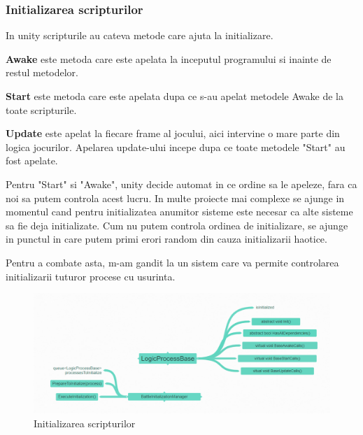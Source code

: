 \documentclass[12pt, a4paper]{article}
\begin{document}
	\subsubsection{Initializarea scripturilor}
	
	In unity scripturile au cateva metode care ajuta la initializare.
	
	\textbf{Awake} este metoda care este apelata la inceputul programului si inainte de restul metodelor.
	
	\textbf{Start} este metoda care este apelata dupa ce s-au apelat metodele Awake de la toate scripturile.
	
	\textbf{Update} este apelat la fiecare frame al jocului, aici intervine o mare parte din logica jocurilor. Apelarea update-ului incepe dupa ce toate metodele "Start" au fost apelate.
	
	Pentru "Start" si "Awake", unity decide automat in ce ordine sa le apeleze, fara ca noi sa putem controla acest lucru. In multe proiecte mai complexe se ajunge in momentul cand pentru initializatea anumitor sisteme este necesar ca alte sisteme sa fie deja initializate. Cum nu putem controla ordinea de initializare, se ajunge in punctul in care putem primi erori random din cauza initializarii haotice.
	
	Pentru a combate asta, m-am gandit la un sistem care va permite controlarea initializarii tuturor procese cu usurinta.
	
	\begin{figure}[H]
		\centering
		\includegraphics[width=1\textwidth]{logicProcessCoggle.png}
		\caption{Initializarea scripturilor}
		\label{fig: logicProcessCoggle}
	\end{figure}
	
\end{document}
